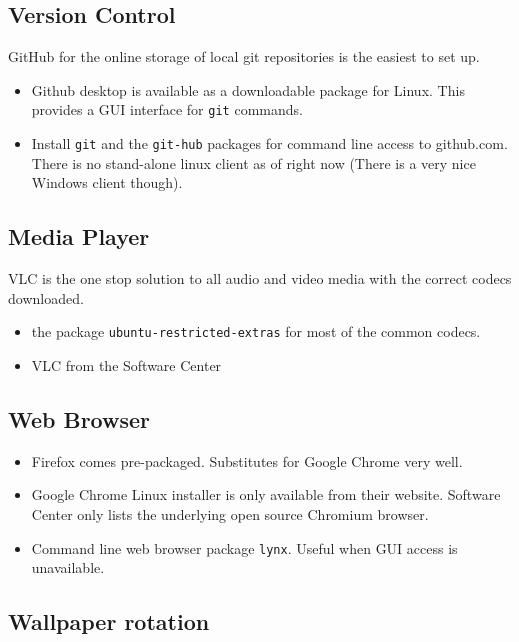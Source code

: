 \documentclass[8pt,letterpaper,twocolumn]{article}
\begin{document}
\subsection{Version Control}

GitHub for the online storage of local git repositories is the easiest to set up.

\begin{itemize}
	\item Github desktop is available as a downloadable package for Linux. This provides a GUI interface for \texttt{git} commands.
	\item Install \texttt{git} and the \texttt{git-hub} packages for command line access to github.com. There is no stand-alone linux client as of right now (There is a very nice Windows client though).
\end{itemize}

\subsection{Media Player}

VLC is the one stop solution to all audio and video media with the correct codecs downloaded.

\begin{itemize}
	\item the package \texttt{ubuntu-restricted-extras} for most of the common codecs.
	\item VLC from the Software Center
\end{itemize}

\subsection{Web Browser}

\begin{itemize}
	\item Firefox comes pre-packaged. Substitutes for Google Chrome very well.
	\item Google Chrome Linux installer is only available from their website. Software Center only lists the underlying open source Chromium browser.
	\item Command line web browser package \texttt{lynx}. Useful when GUI access is unavailable.

\end{itemize}

\subsection{Wallpaper rotation}
\end{document}
